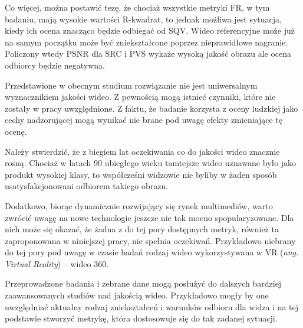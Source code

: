 Co więcej, można postawić tezę, że chociaż wszystkie metryki FR, w tym badaniu, mają wysokie wartości R-kwadrat, to jednak możliwa jest sytuacja, kiedy ich ocena znacząco będzie odbiegać od SQV. Wideo referencyjne może już na samym początku może być zniekształcone poprzez nieprawidłowe nagranie. Policzony wtedy PSNR dla SRC i PVS wykaże wysoką jakość obrazu ale ocena odbiorcy będzie negatywna.

Przedstawione w obecnym studium rozwiązanie nie jest uniwersalnym wyznacznikiem jakości wideo. Z pewnością mogą istnieć czynniki, które nie zostały w pracy uwzględnione. Z faktu, że badanie korzysta z oceny ludzkiej jako cechy nadzorującej mogą wynikać nie brane pod uwagę efekty zmieniające tę ocenę.

Należy stwierdzić, że z biegiem lat oczekiwania co do jakości wideo znacznie rosną. Chociaż w latach 90 ubiegłego wieku tamtejsze wideo uznawane było jako produkt wysokiej klasy, to współcześni widzowie nie byliby w żaden sposób usatysfakcjonowani odbiorem takiego obrazu. 

Dodatkowo, biorąc dynamicznie rozwijający się rynek multimediów, warto zwrócić uwagę na nowe technologie jeszcze nie tak mocno spopularyzowane. Dla nich może się okazać, że żadna z do tej pory dostępnych metryk, również ta  zaproponowana w niniejszej pracy,  nie spełnia oczekiwań. Przykładowo niebrany do tej pory pod uwagę w czasie badań rodzaj wideo wykorzystywana w VR (\textit{ang. Virtual Reality}) -- wideo 360.  

Przeprowadzone badania i zebrane dane mogą posłużyć do dalszych bardziej
zaawansowanych studiów nad jakością wideo. Przykładowo mogły by one uwzględniać aktualny rodzaj zniekształceń i warunków odbioru dla widza i na tej podstawie stworzyć metrykę, która dostosowuje się do tak zadanej sytuacji.


\label{cha:pierwszyDokument}










